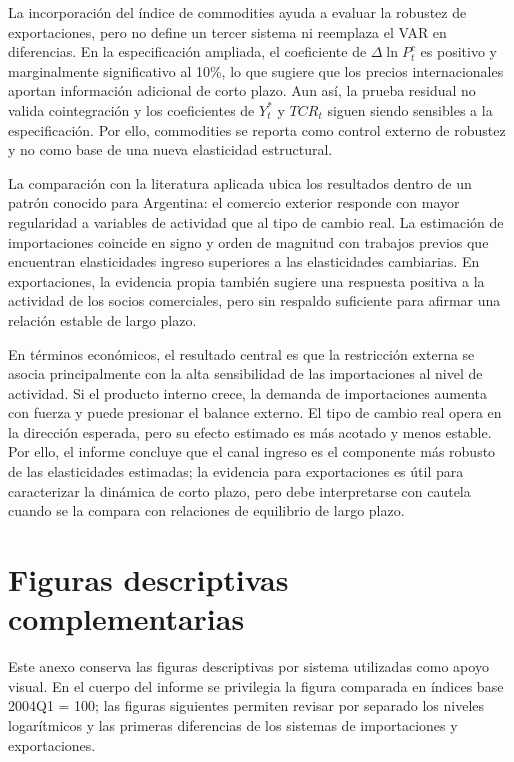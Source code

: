\documentclass[11pt,a4paper]{article}
\begin{document}
	La incorporación del índice de commodities ayuda a evaluar la robustez de
	exportaciones, pero no define un tercer sistema ni reemplaza el VAR en
	diferencias. En la especificación ampliada, el coeficiente de
	\(\Delta \ln P_t^c\) es positivo y marginalmente significativo al 10\%, lo que
	sugiere que los precios internacionales aportan información adicional de corto
	plazo. Aun así, la prueba residual no valida cointegración y los coeficientes de
	\(Y_t^*\) y \(TCR_t\) siguen siendo sensibles a la especificación. Por ello,
	commodities se reporta como control externo de robustez y no como base de una
	nueva elasticidad estructural.

	La comparación con la literatura aplicada ubica los resultados dentro de un
	patrón conocido para Argentina: el comercio exterior responde con mayor
	regularidad a variables de actividad que al tipo de cambio real. La estimación
	de importaciones coincide en signo y orden de magnitud con trabajos previos que
	encuentran elasticidades ingreso superiores a las elasticidades cambiarias. En
	exportaciones, la evidencia propia también sugiere una respuesta positiva a la
	actividad de los socios comerciales, pero sin respaldo suficiente para afirmar
	una relación estable de largo plazo.

	En términos económicos, el resultado central es que la restricción externa se
	asocia principalmente con la alta sensibilidad de las importaciones al nivel de
	actividad. Si el producto interno crece, la demanda de importaciones aumenta
	con fuerza y puede presionar el balance externo. El tipo de cambio real opera
	en la dirección esperada, pero su efecto estimado es más acotado y menos
	estable. Por ello, el informe concluye que el canal ingreso es el componente
	más robusto de las elasticidades estimadas; la evidencia para exportaciones es
	útil para caracterizar la dinámica de corto plazo, pero debe interpretarse con
	cautela cuando se la compara con relaciones de equilibrio de largo plazo.

	\appendix
	\section{Figuras descriptivas complementarias}
	\label{app:figuras-descriptivas}

	Este anexo conserva las figuras descriptivas por sistema utilizadas como apoyo
	visual. En el cuerpo del informe se privilegia la figura comparada en índices
	base 2004Q1 = 100; las figuras siguientes permiten revisar por separado los
	niveles logarítmicos y las primeras diferencias de los sistemas de importaciones
	y exportaciones.
\end{document}
